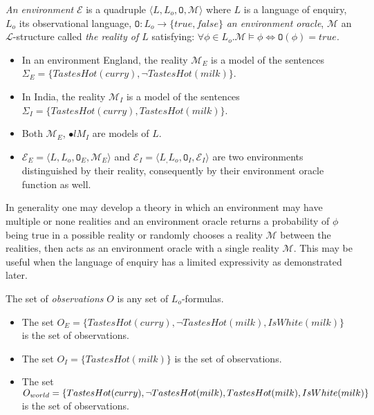 \begin{defn}
\emph{An environment} $\mathcal{E}$ is a quadruple $\langle L, L_o, \mathtt{O}, \mathcal{M} \rangle$ where $L$ is a language of enquiry, $L_o$ its observational language, $\mathtt{O}:L_o \to \{true, false\}$ \emph{an environment oracle}, $\mathcal{M}$ an $\mathcal{L}$-structure called \emph{the reality of $L$} satisfying:
$\forall \phi \in L_o. \mathcal{M} \models \phi \iff \mathtt{O}(\phi)=true$.
\end{defn}

\begin{exmp}
\begin{itemize}
\item In an environment England, the reality $\mathcal{M}_E$ is a model of the sentences\\ $\Sigma_E=\{TastesHot(curry), \neg TastesHot(milk)\}$.
\item In India, the reality $\mathcal{M}_I$ is a model of the sentences\\ $\Sigma_I=\{TastesHot(curry), TastesHot(milk)\}$.
\item Both $\mathcal{M}_E$, $\mathcal{•}l{M}_I$ are models of $L$.
\item $\mathcal{E}_E=\langle L, L_o, \mathtt{O}_E, \mathcal{M}_E \rangle$ and
$\mathcal{E}_I=\langle L_, L_o, \mathtt{O}_I, \mathcal{E}_I \rangle$ are two environments distinguished by their reality, consequently by their environment oracle function as well.
\end{itemize}
\end{exmp}

\begin{remark}
In generality one may develop a theory in which an environment may have multiple or none realities and an environment oracle returns a probability of $\phi$ being true in a possible reality or randomly chooses a reality $\mathcal{M}$ between the realities, then acts as an environment oracle with a single reality $\mathcal{M}$. This may be useful when the language of enquiry has a limited expressivity as demonstrated later.
\end{remark}

\begin{defn}
The set of \emph{observations} $O$ is any set of $L_o$-formulas.
\end{defn}

\begin{exmp}
\begin{itemize}
\item The set $O_E=\{TastesHot(curry), \neg TastesHot(milk), IsWhite(milk)\}$ is the set of observations.
\item The set $O_I=\{TastesHot(milk)\}$ is the set of observations.
\item The set $O_{world}=\{TastesHot(curry), \neg TastesHot(milk), TastesHot(milk), \\
IsWhite(milk)\}$ is the set of observations.
\end{itemize}
\end{exmp}

